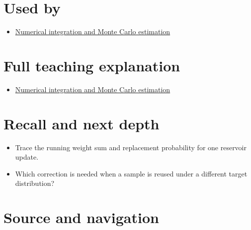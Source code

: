 \section{Used by}\label{appendix-68be451b78b1-used-by}

\begin{itemize}
\tightlist
\item
  \href{Continuous\%20Notes/University\%20-\%20Worlds,\%20Images\%20and\%20Inference\%20-\%20Graphics,\%20Vision\%20and\%20Photography\#Numerical\%20integration\%20and\%20Monte\%20Carlo\%20estimation}{Numerical integration and Monte Carlo estimation}
\end{itemize}

\section{Full teaching explanation}\label{appendix-68be451b78b1-full-teaching-explanation}

\begin{itemize}
\tightlist
\item
  \href{Continuous\%20Notes/University\%20-\%20Worlds,\%20Images\%20and\%20Inference\%20-\%20Graphics,\%20Vision\%20and\%20Photography\#Numerical\%20integration\%20and\%20Monte\%20Carlo\%20estimation}{Numerical integration and Monte Carlo estimation}
\end{itemize}

\section{Recall and next depth}\label{appendix-68be451b78b1-recall-and-next-depth}

\begin{itemize}
\tightlist
\item
  Trace the running weight sum and replacement probability for one reservoir update.
\item
  Which correction is needed when a sample is reused under a different target distribution?
\end{itemize}

\section{Source and navigation}\label{appendix-68be451b78b1-source-and-navigation}

